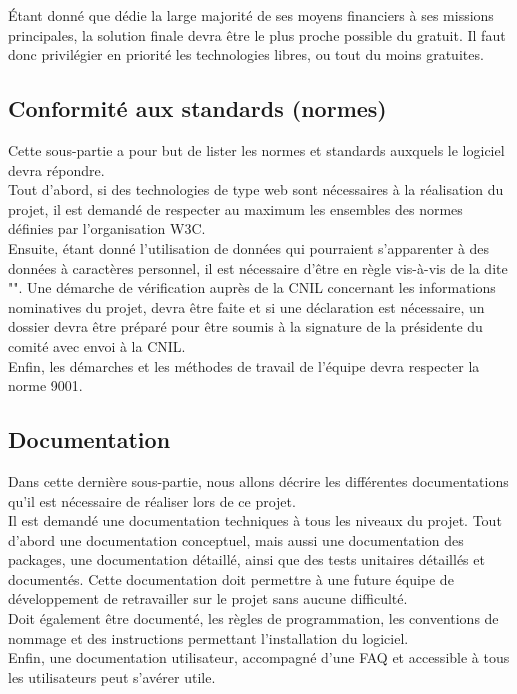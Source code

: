 Étant donné que \nomClient{} dédie la large majorité de ses moyens financiers à ses missions principales, la solution finale devra être le plus proche possible du gratuit. Il faut donc privilégier en priorité les technologies libres, ou tout du moins gratuites.


\subsection{Conformité aux standards (normes)}
Cette sous-partie a pour but de lister les normes et standards auxquels le logiciel devra répondre.\\

Tout d'abord, si des technologies de type web sont nécessaires à la réalisation du projet, il est demandé de respecter au maximum les ensembles des normes définies par l'organisation W3C.\\

Ensuite, étant donné l'utilisation de données qui pourraient s'apparenter à des données à caractères personnel, il est nécessaire d'être en règle vis-à-vis de la \loiInfoLib{} dite "\loiInfoLibCourt{}". Une démarche de vérification auprès de la CNIL concernant les informations nominatives du projet, devra être faite et si une déclaration est nécessaire, un dossier devra être préparé pour être soumis à la signature de la présidente du comité avec envoi à la CNIL.\\

Enfin, les démarches et les méthodes de travail de l'équipe \PICCourt{} devra respecter la norme \ISOCourt{} 9001.

\subsection{Documentation}
\label{doc}
Dans cette dernière sous-partie, nous allons décrire les différentes documentations qu'il est nécessaire de réaliser lors de ce projet.\\

Il est demandé une documentation techniques à tous les niveaux du projet. Tout d'abord une documentation conceptuel, mais aussi une documentation des packages, une documentation détaillé, ainsi que des tests unitaires détaillés et documentés. Cette documentation doit permettre à une future équipe de développement de retravailler sur le projet sans aucune difficulté.\\

Doit également être documenté, les règles de programmation, les conventions de nommage et des instructions permettant l'installation du logiciel.\\

Enfin, une documentation utilisateur, accompagné d'une FAQ et accessible à tous les utilisateurs peut s'avérer utile.